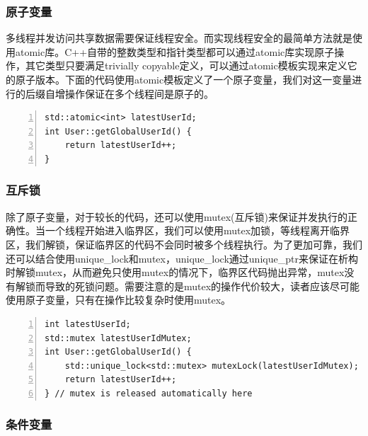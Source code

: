 \documentclass{ctexart}
\begin{document}
\subsubsection{原子变量}

多线程并发访问共享数据需要保证线程安全。而实现线程安全的最简单方法就是使用atomic库。C++自带的整数类型和指针类型都可以通过atomic库实现原子操作，其它类型只要满足trivially copyable定义，可以通过atomic模板实现来定义它的原子版本。下面的代码使用atomic模板定义了一个原子变量，我们对这一变量进行的后缀自增操作保证在多个线程间是原子的。

\begin{lstlisting}[language={[ANSI]C},keywordstyle=\color{blue!70},commentstyle=\color{red!50!green!50!blue!50},frame=shadowbox, rulesepcolor=\color{red!20!green!20!blue!20},basicstyle=\small,numbers=left, numberstyle=\tiny,breaklines=true]
std::atomic<int> latestUserId;  
int User::getGlobalUserId() {  
	return latestUserId++;  
}
\end{lstlisting}

\subsubsection{互斥锁}

除了原子变量，对于较长的代码，还可以使用mutex(互斥锁)来保证并发执行的正确性。当一个线程开始进入临界区，我们可以使用mutex加锁，等线程离开临界区，我们解锁，保证临界区的代码不会同时被多个线程执行。为了更加可靠，我们还可以结合使用unique\_lock和mutex，unique\_lock通过unique\_ptr来保证在析构时解锁mutex，从而避免只使用mutex的情况下，临界区代码抛出异常，mutex没有解锁而导致的死锁问题。需要注意的是mutex的操作代价较大，读者应该尽可能使用原子变量，只有在操作比较复杂时使用mutex。

\begin{lstlisting}[language={[ANSI]C},keywordstyle=\color{blue!70},commentstyle=\color{red!50!green!50!blue!50},frame=shadowbox, rulesepcolor=\color{red!20!green!20!blue!20},basicstyle=\small,numbers=left, numberstyle=\tiny,breaklines=true]
int latestUserId;  
std::mutex latestUserIdMutex;  
int User::getGlobalUserId() {  
	std::unique_lock<std::mutex> mutexLock(latestUserIdMutex);  
	return latestUserId++;  
} // mutex is released automatically here
\end{lstlisting}

\subsubsection{条件变量}
\end{document}

